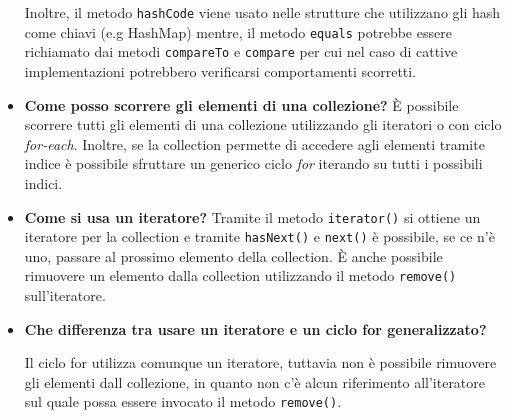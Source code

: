 \documentclass[12pt, a4paper]{article}
\begin{document}
\begin{itemize}
    Inoltre, il metodo \texttt{hashCode} viene usato nelle strutture che utilizzano
    gli hash come chiavi (e.g HashMap) mentre, il metodo \texttt{equals} potrebbe
    essere richiamato dai metodi \texttt{compareTo} e \texttt{compare} per cui nel
    caso di cattive implementazioni potrebbero verificarsi comportamenti scorretti.

    \item \textbf{Come posso scorrere gli elementi di una collezione?}
    È possibile scorrere tutti gli elementi di una collezione utilizzando gli
    iteratori o con ciclo \emph{for-each}. Inoltre, se la collection permette di
    accedere agli elementi tramite indice è possibile sfruttare un generico ciclo
    \emph{for} iterando su tutti i possibili indici.

    \item \textbf{Come si usa un iteratore?}
    Tramite il metodo \texttt{iterator()} si ottiene un iteratore per la collection
    e tramite \texttt{hasNext()} e \texttt{next()} è possibile, se ce n'è uno,
    passare al prossimo elemento della collection. È anche possibile rimuovere un
    elemento dalla collection utilizzando il metodo \texttt{remove()} sull'iteratore.

    \item \textbf{Che differenza tra usare un iteratore e un ciclo for generalizzato?}
    
    Il ciclo for utilizza comunque un iteratore, tuttavia non è possibile rimuovere
    gli elementi dall collezione, in quanto non c'è alcun riferimento all'iteratore
    sul quale possa essere invocato il metodo \texttt{remove()}.
\end{itemize}
\end{document}
